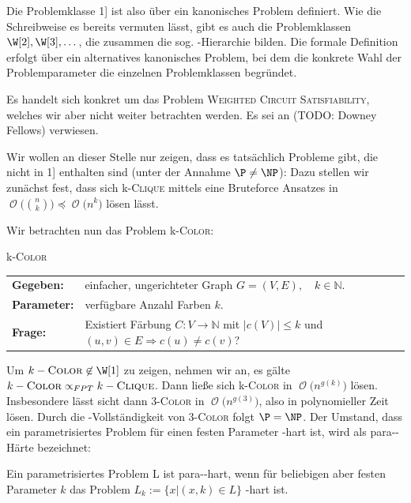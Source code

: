 \documentclass[a4paper,ngerman]{atseminar}
\newcommand{\N}{\ensuremath{\mathbb{N}}\xspace}
\newcommand{\BigO}[1]{\ensuremath{\operatorname{\mathcal{O}}\bigl(#1\bigr)}\xspace}
\begin{document}
\noindent
Die Problemklasse \W{[}1{]} ist also über ein kanonisches Problem definiert. Wie die Schreibweise es bereits vermuten lässt,
gibt es auch die Problemklassen $\W[2],\xspace\W[3], \dots$, die zusammen die sog. \W-Hierarchie bilden. Die formale Definition erfolgt über
ein alternatives kanonisches Problem, bei dem die konkrete Wahl der Problemparameter die einzelnen Problemklassen begründet.

\noindent
Es handelt sich konkret um das Problem \textsc{Weighted Circuit Satisfiability}, welches wir aber nicht weiter betrachten werden. Es sei an (TODO: Downey Fellows) verwiesen.

\noindent
Wir wollen an dieser Stelle nur zeigen, dass es tatsächlich Probleme gibt, die nicht in \W{[}1{]}  enthalten sind (unter der Annahme $\P \neq \NP$):
Dazu stellen wir zunächst fest, dass sich k-\textsc{Clique} mittels eine Bruteforce Ansatzes in $\BigO{\binom{n}{k}} \preceq \BigO{n^k}$ lösen lässt.

\noindent
Wir betrachten nun das Problem k-\textsc{Color}:

\begin{definition}{k-\textsc{Color}}
  \\
  \begin{tabular}{ll}
    \textbf{Gegeben:} & einfacher, ungerichteter Graph  $G = (V, E), \quad k \in \N$. \\
    \textbf{Parameter:} & verfügbare Anzahl Farben $k$. \\
    \textbf{Frage:} & Existiert Färbung $C: V \rightarrow \N$ mit $|c(V)| \leq k$ und $(u, v) \in E \Rightarrow c(u) \neq c(v)$?
  \end{tabular}
\end{definition}

\noindent
Um $k-\textsc{Color} \not\in \W[1]$ zu zeigen, nehmen wir an, es gälte $k-\textsc{Color} \propto_{FPT} k-\textsc{Clique}$.
Dann ließe sich k-\textsc{Color} in $\BigO{n^{g(k)}}$ lösen. Insbesondere lässt sicht dann 3-\textsc{Color} in $\BigO{n^{g(3)}}$, also in polynomieller Zeit lösen.
Durch die \NP-Vollständigkeit von 3-\textsc{Color} folgt $\P = \NP$.
Der Umstand, dass ein parametrisiertes Problem für einen festen Parameter \NP-hart ist, wird als para-\NP-Härte bezeichnet:

\begin{definition}
  Ein parametrisiertes Problem L ist para-\NP-hart, wenn für beliebigen aber festen Parameter $k$ das Problem
  $L_k := \{x | (x, k) \in L\}$ \NP-hart ist.
\end{definition}
\end{document}
